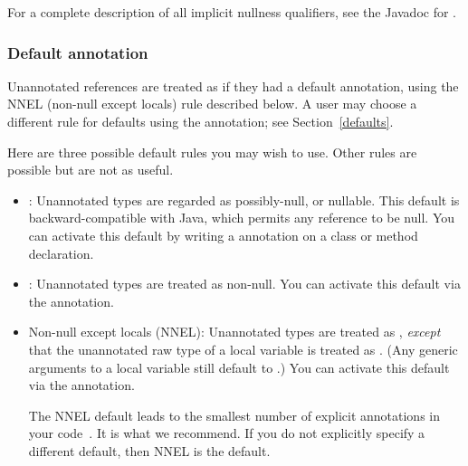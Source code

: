 For a complete description of all implicit nullness qualifiers, see the
Javadoc for .



\subsubsection{Default annotation\label{null-defaults}}

Unannotated references are treated as if they had a default annotation,
using the NNEL (non-null except locals) rule described below.
A user may choose a different rule for defaults using the 
 annotation; see
Section~\ref{defaults}.

\begin{sloppy}
Here are three possible default rules you may wish to use.  Other rules are
possible but are not as useful.
\begin{itemize}
\item
  :  Unannotated types are regarded as possibly-null, or
  nullable.  This default is backward-compatible with Java, which permits
  any reference to be null.  You can activate this default by writing
  a  annotation on a
  class or method
  declaration.
\item
  :  Unannotated types are treated as non-null.
  You can activate this
  default via the
   annotation.
\item
  Non-null except locals (NNEL):  Unannotated types are treated as
  , \emph{except} that the unannotated raw type of a local
  variable is treated as .  (Any generic arguments to a
  local variable still default to .)  You can activate this
  default via the  annotation.

  The NNEL default leads to the smallest number of explicit annotations in
  your code~\cite{PapiACPE2008}.  It is what we recommend.  If you do not
  explicitly specify a different default, then NNEL is the default.
\end{itemize}
\end{sloppy}

